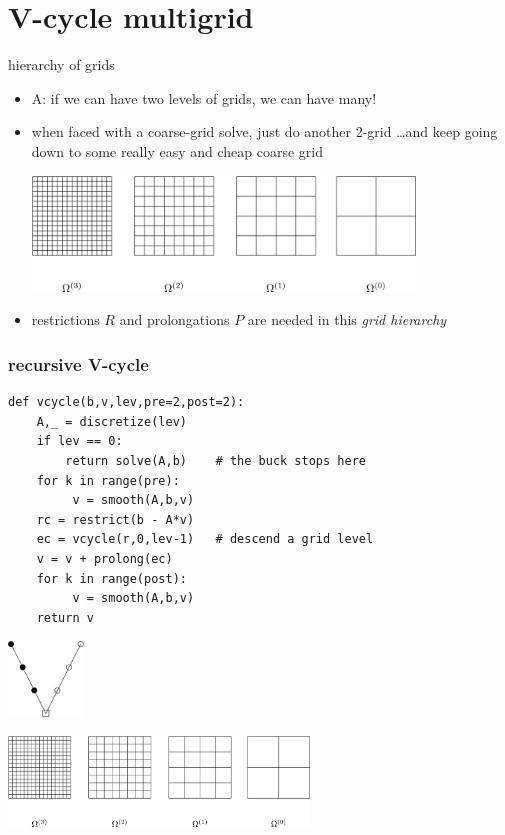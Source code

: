 \documentclass[10pt,
               svgnames,
               hyperref={colorlinks,citecolor=DeepPink4,linkcolor=FireBrick,urlcolor=Maroon},
               usepdftitle=false]{beamer}
\begin{document}
\section{V-cycle multigrid}

\begin{frame}{hierarchy of grids}
\begin{itemize}
\item A: if we can have two levels of grids, we can have many!
\item when faced with a coarse-grid solve, just do another 2-grid \dots and keep going down to some really easy and cheap coarse grid

\bigskip\medskip
\hfill \includegraphics[width=0.8\textwidth]{images/multigrid-grids.png}

\medskip
\item restrictions $R$ and prolongations $P$ are needed in this \emph{grid hierarchy}

\end{itemize}
\end{frame}


\begin{frame}[fragile]
\frametitle{recursive V-cycle}
\begin{verbatim}
def vcycle(b,v,lev,pre=2,post=2):
    A,_ = discretize(lev)
    if lev == 0:
        return solve(A,b)    # the buck stops here
    for k in range(pre):
         v = smooth(A,b,v)
    rc = restrict(b - A*v)
    ec = vcycle(r,0,lev-1)   # descend a grid level
    v = v + prolong(ec)
    for k in range(post):
         v = smooth(A,b,v)
    return v
\end{verbatim}

\vspace{-5mm}
\hfill \includegraphics[width=0.15\textwidth]{images/vcycle.png}

\vspace{-8mm}
\hspace{5mm} \includegraphics[width=0.6\textwidth]{images/multigrid-grids.png}
\end{frame}
\end{document}
